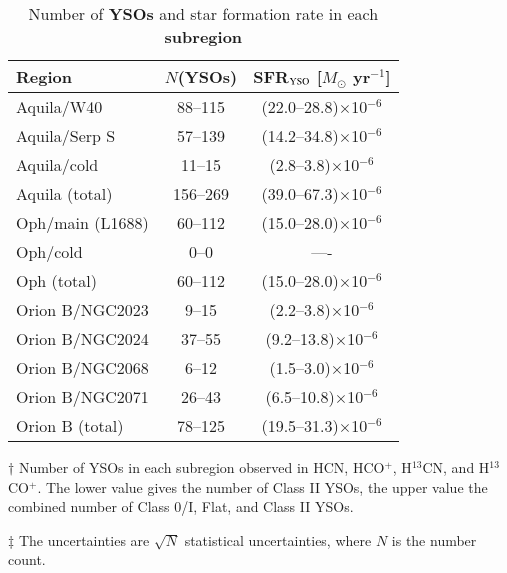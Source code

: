 %
\begin{table}
\centering
\begin{threeparttable}
\caption{Number of {\bf YSOs} and star formation rate in each {\bf subregion}  \label{table:sfr}}
\begin{tabular}{lcc}
\hline
Region        & $N$({\bf YSOs})\tnote{$\dagger$} & SFR$_{\rm YSO}$ [$M_{\odot}$ yr$^{-1}$]\tnote{$\ddagger$}    \\
\hline
Aquila/W40&      88--115&  (22.0--28.8)$\times$10$^{-6}$ \\
Aquila/Serp S&      57--139&  (14.2--34.8)$\times$10$^{-6}$ \\
Aquila/cold&      11--15&   (2.8--3.8)$\times$10$^{-6}$ \\
\hdashline
Aquila (total)&     156--269&  (39.0--67.3)$\times$10$^{-6}$ \\
\hline
Oph/main (L1688)&      60--112&  (15.0--28.0)$\times$10$^{-6}$ \\
Oph/cold&       0--0&---- \\
\hdashline
Oph (total)&      60--112&  (15.0--28.0)$\times$10$^{-6}$ \\
\hline
Orion B/NGC2023&       {9--15}&   {(2.2--3.8)}$\times$10$^{-6}$ \\
Orion B/NGC2024&      {37--55}&   {(9.2--13.8)}$\times$10$^{-6}$ \\
Orion B/NGC2068&       {6--12}&   {(1.5--3.0)}$\times$10$^{-6}$ \\
Orion B/NGC2071&      26--43&   (6.5--10.8)$\times$10$^{-6}$ \\
\hdashline
Orion B (total)&      {78--125}&  {(19.5--31.3)}$\times$10$^{-6}$ \\
\hline
\end{tabular}
\begin{tablenotes}
\item[$\dagger$] {Number of YSOs in each subregion observed 
in HCN, HCO$^{+}$, H$^{13}$CN, and H$^{13}$CO$^{+}$.
The lower value gives the number of Class II YSOs, the upper value 
the combined number of  Class 0/I, Flat, and Class II YSOs.}
\item[$\ddagger$] The uncertainties are $\sqrt{N}$ statistical uncertainties, where $N$ is the number count.
\end{tablenotes}
\end{threeparttable}
\end{table}
